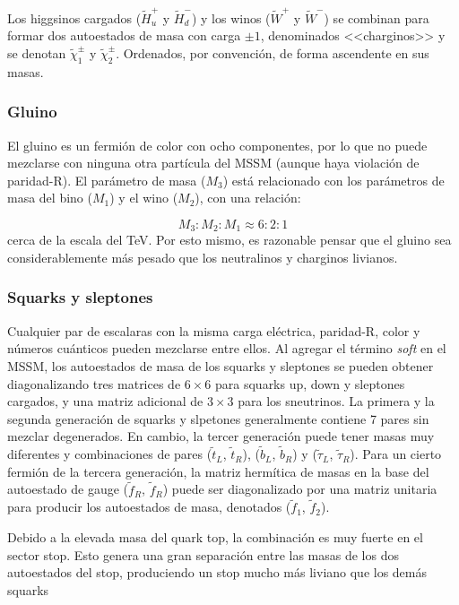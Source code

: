 Los higgsinos cargados ($\widetilde{H}^{+}_{u}$ y $\widetilde{H}^{-}_{d}$) y los winos ($\widetilde{W}^{+}$ y $\widetilde{W}^{-}$) se combinan para formar dos autoestados de masa con carga $\pm1$, denominados <<charginos>> y se denotan $\widetilde{\chi}^{\pm}_{1}$ y $\widetilde{\chi}^{\pm}_{2}$. Ordenados, por convención, de forma ascendente en sus masas.


\subsubsection{Gluino}

El gluino es un fermión de color con ocho componentes, por lo que no puede mezclarse con ninguna otra partícula del MSSM (aunque haya violación de paridad-R). El parámetro de masa ($M_{3}$) está relacionado con los parámetros de masa del bino ($M_{1}$) y el wino ($M_{2}$), con una relación:

\begin{equation}
M_{3}:M_{2}:M_{1} \approx 6:2:1
\end{equation}
%
cerca de la escala del TeV. Por esto mismo, es razonable pensar que el gluino sea considerablemente más pesado que los neutralinos y charginos livianos.


\subsubsection{Squarks y sleptones}

Cualquier par de escalaras con la misma carga eléctrica, paridad-R, color y números cuánticos pueden mezclarse entre ellos. Al agregar el término \textit{soft} en el MSSM, los autoestados de masa de los squarks y sleptones se pueden obtener diagonalizando tres matrices de $6 \times 6$ para squarks up, down y sleptones cargados, y una matriz adicional de $3 \times 3$ para los sneutrinos. La primera y la segunda generación de squarks y slpetones generalmente contiene 7 pares sin mezclar degenerados. En cambio, la tercer generación puede tener masas muy diferentes y combinaciones de pares ($\tilde{t}_{L}$, $\tilde{t}_{R}$), ($\tilde{b}_{L}$, $\tilde{b}_{R}$) y ($\tilde{\tau}_{L}$, $\tilde{\tau}_{R}$). Para un cierto fermión de la tercera generación, la matriz hermítica de masas en la base del autoestado de gauge ($\tilde{f}_{R}$, $\tilde{f}_{R}$) puede ser diagonalizado por una matriz unitaria para producir los autoestados de masa, denotados ($\tilde{f}_{1}$, $\tilde{f}_{2}$).

Debido a la elevada masa del quark top, la combinación es muy fuerte en el sector stop. Esto genera una gran separación entre las masas de los dos autoestados del stop, produciendo un stop mucho más liviano que los demás squarks

